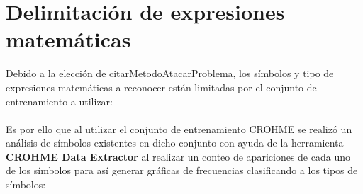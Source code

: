 \newpage
\section{Delimitación de expresiones matemáticas}

Debido a la elección de citarMetodoAtacarProblema, los símbolos y tipo de expresiones matemáticas a reconocer están limitadas por el conjunto de entrenamiento a utilizar:
\\\\
Es por ello que al utilizar el conjunto de entrenamiento CROHME %
se realizó un análisis de símbolos existentes en dicho conjunto con ayuda de la herramienta \textbf{CROHME Data Extractor} al realizar un conteo de apariciones de cada uno de los símbolos para así generar gráficas de frecuencias clasificando a los tipos de símbolos:\\\\

